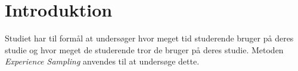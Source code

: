 \chapter*{Introduktion}
Studiet har til formål at undersøger hvor meget tid studerende bruger på deres studie og hvor meget de studerende tror de bruger på deres studie. Metoden \textit{Experience Sampling} anvendes til at undersøge dette.